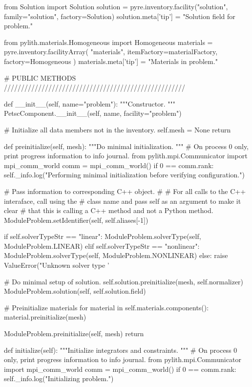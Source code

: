 \begin{python}
    from Solution import Solution
    solution = pyre.inventory.facility("solution", family="solution", factory=Solution)
    solution.meta['tip'] = "Solution field for problem."

    from pylith.materials.Homogeneous import Homogeneous
    materials = pyre.inventory.facilityArray(
        "materials",
        itemFactory=materialFactory,
        factory=Homogeneous
    )
    materials.meta['tip'] = "Materials in problem."

        
    # PUBLIC METHODS /////////////////////////////////////////////////////

    def __init__(self, name="problem"):
        """Constructor.
        """
        PetscComponent.__init__(self, name, facility="problem")

        # Initialize all data members not in the inventory.
        self.mesh = None
        return

    def preinitialize(self, mesh):
        """Do minimal initialization.
        """
        # On process 0 only, print progress information to info journal.
        from pylith.mpi.Communicator import mpi_comm_world
        comm = mpi_comm_world()
        if 0 == comm.rank:
            self._info.log("Performing minimal initialization before verifying configuration.")

        # Pass information to corresponding C++ object.
        #
        # For all calls to the C++ interaface, call using the
        # class name and pass self as an argument to make it clear
        # that this is calling a C++ method and not a Python method.
        ModuleProblem.setIdentifier(self, self.aliases[-1])

        if self.solverTypeStr == "linear":
            ModuleProblem.solverType(self, ModuleProblem.LINEAR)
        elif self.solverTypeStr == "nonlinear":
            ModuleProblem.solverType(self, ModuleProblem.NONLINEAR)
        else:
            raise ValueError("Unknown solver type '%

        # Do minimal setup of solution.
        self.solution.preinitialize(mesh, self.normalizer)
        ModuleProblem.solution(self, self.solution.field)

        # Preinitialize materials
        for material in self.materials.components():
            material.preinitialize(mesh)

        ModuleProblem.preinitialize(self, mesh)
        return

    def initialize(self):
        """Initialize integrators and constraints.
        """
        # On process 0 only, print progress information to info journal.
        from pylith.mpi.Communicator import mpi_comm_world
        comm = mpi_comm_world()
        if 0 == comm.rank:
            self._info.log("Initializing problem.")


\end{python}
